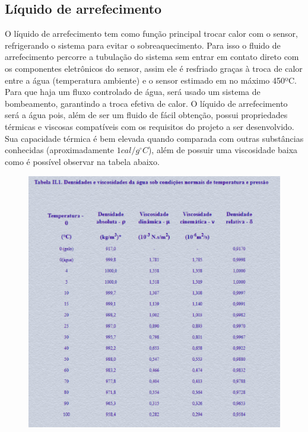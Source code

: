 \subsection{Líquido de arrefecimento}

O líquido de arrefecimento tem como função principal trocar calor com o sensor, refrigerando o sistema para evitar o sobreaquecimento.
Para isso o fluido de arrefecimento percorre a tubulação do sistema sem entrar em contato direto com os componentes eletrônicos do sensor, assim ele é resfriado graças à troca de calor entre a água (temperatura ambiente) e o sensor estimado em no máximo 450ºC.  Para que haja um fluxo controlado de água, será usado um sistema de bombeamento, garantindo a troca efetiva de calor.
O líquido de arrefecimento será a água pois, além de ser um fluido de fácil obtenção, possui propriedades térmicas e viscosas compatíveis com os requisitos do projeto a ser desenvolvido.
Sua capacidade térmica é bem elevada quando comparada com outras substâncias conhecidas (aproximadamente $1cal/g^{\circ}C$), além de possuir uma viscosidade baixa como é possível observar na tabela abaixo.

\newpage

\begin{figure}[!htb]                                                               
   \centering                                                                      
   \includegraphics[scale=0.8, keepaspectratio=true]{figuras/tabelaagua.eps}               
\end{figure}

